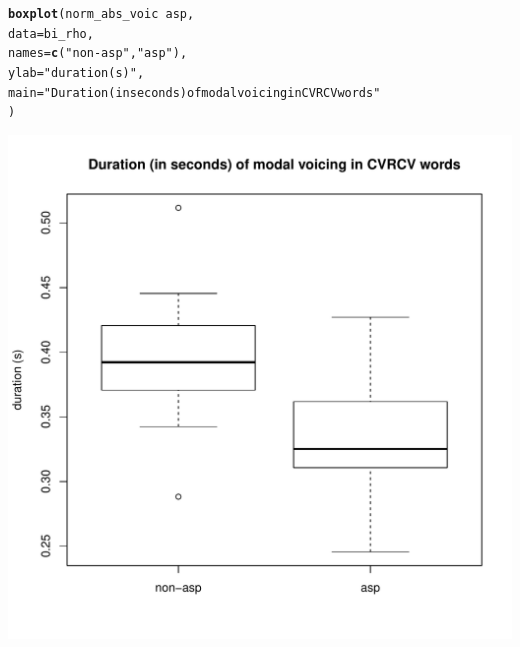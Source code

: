 \documentclass[a4paper,11pt]{article}\usepackage[]{graphicx}\usepackage[]{color}
\makeatletter
\def\maxwidth{ %
  \ifdim\Gin@nat@width>\linewidth
    \linewidth
  \else
    \Gin@nat@width
  \fi
}
\newcommand{\hlstr}[1]{\textcolor[rgb]{0.192,0.494,0.8}{#1}}%
\newcommand{\hlopt}[1]{\textcolor[rgb]{0,0,0}{#1}}%
\newcommand{\hlstd}[1]{\textcolor[rgb]{0.345,0.345,0.345}{#1}}%
\newcommand{\hlkwc}[1]{\textcolor[rgb]{0.333,0.667,0.333}{#1}}%
\newcommand{\hlkwd}[1]{\textcolor[rgb]{0.737,0.353,0.396}{\textbf{#1}}}%
\newenvironment{kframe}{%
 \def\at@end@of@kframe{}%
 \ifinner\ifhmode%
  \def\at@end@of@kframe{\end{minipage}}%
  \begin{minipage}{\columnwidth}%
 \fi\fi%
 \def\FrameCommand##1{\hskip\@totalleftmargin \hskip-\fboxsep
 \colorbox{shadecolor}{##1}\hskip-\fboxsep
     \hskip-\linewidth \hskip-\@totalleftmargin \hskip\columnwidth}%
 \MakeFramed {\advance\hsize-\width
   \@totalleftmargin\z@ \linewidth\hsize
   \@setminipage}}%
 {\par\unskip\endMakeFramed%
 \at@end@of@kframe}
\newenvironment{knitrout}{}{} %
\makeatother
\begin{document}
\begin{knitrout}
\end{knitrout}

\begin{knitrout}
\color{fgcolor}\begin{kframe}
\begin{alltt}
\hlkwd{boxplot}\hlstd{(norm_abs_voic} \hlopt{~} \hlstd{asp,}
        \hlkwc{data} \hlstd{= bi_rho,}
        \hlkwc{names} \hlstd{=} \hlkwd{c}\hlstd{(}\hlstr{"non-asp"}\hlstd{,} \hlstr{"asp"}\hlstd{),}
        \hlkwc{ylab} \hlstd{=} \hlstr{"duration (s)"}\hlstd{,}
        \hlkwc{main} \hlstd{=} \hlstr{"Duration (in seconds) of modal voicing in CVRCV words"}
        \hlstd{)}
\end{alltt}
\end{kframe}
\includegraphics[width=\maxwidth]{img/bi-rho-box-1} 

\end{knitrout}
\end{document}
